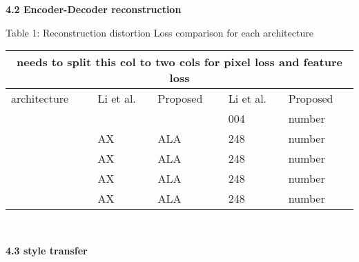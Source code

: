 \begin{flushleft}
\textbf{4.2 Encoder-Decoder reconstruction}\newline
\end{flushleft}
\centering
Table 1: Reconstruction distortion Loss comparison for each architecture
\begin{tabular}{ |p{2cm}||p{2cm}|p{2cm}|p{2cm}|p{2cm}| }
	\hline
	\multicolumn{5}{|c|}{needs to split this col to two cols for pixel loss and feature loss } \\
	\hline
	architecture &Li et al. \cite{bib11} &Proposed &Li et al. \cite{bib11} &Proposed \\
	\hline
	\centering 1  &	     &  &004 &number\\
	\hline
	\centering 2 &AX  &ALA   &248 &number\\
	\hline
	\centering 3 &AX  &ALA   &248 &number\\
	\hline
	\centering 4 &AX  &ALA   &248 &number\\
	\hline
	\centering 5 &AX  &ALA   &248 &number\\
	\hline
\end{tabular}\\
\begin{flushleft}
\textbf{4.3 style transfer}\newline
\end{flushleft}
